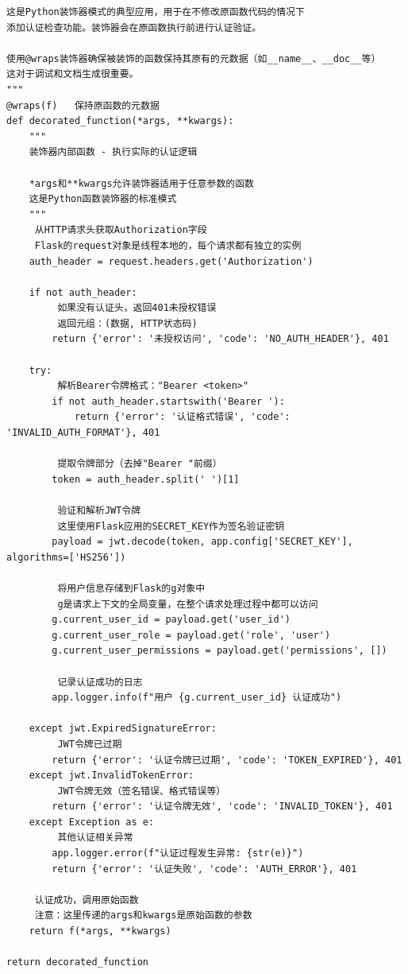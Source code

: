 \begin{verbatim}
这是Python装饰器模式的典型应用，用于在不修改原函数代码的情况下
添加认证检查功能。装饰器会在原函数执行前进行认证验证。

使用@wraps装饰器确保被装饰的函数保持其原有的元数据（如__name__、__doc__等）
这对于调试和文档生成很重要。
"""
@wraps(f)   保持原函数的元数据
def decorated_function(*args, **kwargs):
    """
    装饰器内部函数 - 执行实际的认证逻辑
    
    *args和**kwargs允许装饰器适用于任意参数的函数
    这是Python函数装饰器的标准模式
    """
     从HTTP请求头获取Authorization字段
     Flask的request对象是线程本地的，每个请求都有独立的实例
    auth_header = request.headers.get('Authorization')
    
    if not auth_header:
         如果没有认证头，返回401未授权错误
         返回元组：(数据, HTTP状态码)
        return {'error': '未授权访问', 'code': 'NO_AUTH_HEADER'}, 401
    
    try:
         解析Bearer令牌格式："Bearer <token>"
        if not auth_header.startswith('Bearer '):
            return {'error': '认证格式错误', 'code': 'INVALID_AUTH_FORMAT'}, 401
        
         提取令牌部分（去掉"Bearer "前缀）
        token = auth_header.split(' ')[1]
        
         验证和解析JWT令牌
         这里使用Flask应用的SECRET_KEY作为签名验证密钥
        payload = jwt.decode(token, app.config['SECRET_KEY'], algorithms=['HS256'])
        
         将用户信息存储到Flask的g对象中
         g是请求上下文的全局变量，在整个请求处理过程中都可以访问
        g.current_user_id = payload.get('user_id')
        g.current_user_role = payload.get('role', 'user')
        g.current_user_permissions = payload.get('permissions', [])
        
         记录认证成功的日志
        app.logger.info(f"用户 {g.current_user_id} 认证成功")
        
    except jwt.ExpiredSignatureError:
         JWT令牌已过期
        return {'error': '认证令牌已过期', 'code': 'TOKEN_EXPIRED'}, 401
    except jwt.InvalidTokenError:
         JWT令牌无效（签名错误、格式错误等）
        return {'error': '认证令牌无效', 'code': 'INVALID_TOKEN'}, 401
    except Exception as e:
         其他认证相关异常
        app.logger.error(f"认证过程发生异常: {str(e)}")
        return {'error': '认证失败', 'code': 'AUTH_ERROR'}, 401
    
     认证成功，调用原始函数
     注意：这里传递的args和kwargs是原始函数的参数
    return f(*args, **kwargs)

return decorated_function
\end{verbatim}

